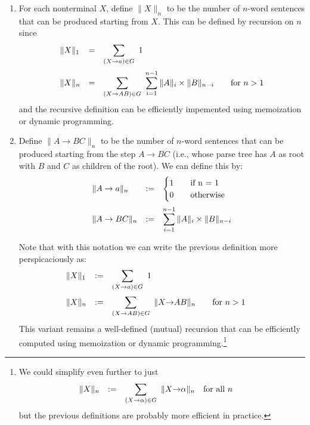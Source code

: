 \documentclass[12pt]{article}
\begin{document}
\begin{enumerate}
    \item For each nonterminal $X$, define $\|X\|_n$ to be the number of $n$-word sentences that can be produced starting from $X$. This can be defined by recursion on $n$ since
    \[
        \begin{array}{lcl@{\qquad}l}
        \|X\|_1 &=& \displaystyle\sum_{(X{\to} a)\in G}\  1\\
        \noalign{\medskip}
        \|X\|_n &=& \displaystyle\sum_{(X{\to} AB)\in G}\  \sum_{i=1}^{n-1}\|A\|_i\times\|B\|_{n-i}&\mbox{for $n>1$}\\
        \end{array}
    \]
    and the recursive definition can be efficiently impemented using memoization or dynamic programming.

    \item Define $\|A\to BC\|_n$ to be the number of $n$-word sentences that can be produced starting from the step $A\to BC$ (i.e., whose parse tree has $A$ as root with $B$ and $C$ as children of the root). We can define this by:
    \[
        \begin{array}{lcl}
        \|A\to a\|_n &:=& \begin{cases}
                            1 &\quad\mbox{if n = 1}\\
                            0 &\quad\mbox{otherwise}\\
                          \end{cases}\\
        \noalign{\medskip}
        \|A\to BC\|_n &:=& \displaystyle\sum_{i=1}^{n-1}\|A\|_i\times\|B\|_{n-i}
    \end{array}
    \]

    Note that with this notation we can write the previous definition more perspicaciously as:
    \[
        \begin{array}{lcl@{\qquad}l}
        \|X\|_1 &:=& \displaystyle\sum_{(X{\to} a)\in G}\  1\\
        \noalign{\medskip}
        \|X\|_n &:=& \displaystyle\sum_{(X{\to} AB)\in G}\  \|X{\to}AB\|_n\qquad\mbox{for $n>1$}\\
        \end{array}
    \]
    This variant remains a well-defined (mutual) recursion that can be efficiently computed using memoization or dynamic programming.\footnote{
    We could simplify even further to just
    \[
        \begin{array}{lcl@{\qquad}l}
        \|X\|_n &:=& \displaystyle\sum_{(X{\to} \alpha)\in G}\  \|X{\to}\alpha\|_n\quad\mbox{for all $n$}\\
        \end{array}
    \]
    but the previous definitions are probably more efficient in practice.}


\end{enumerate}
\end{document}
